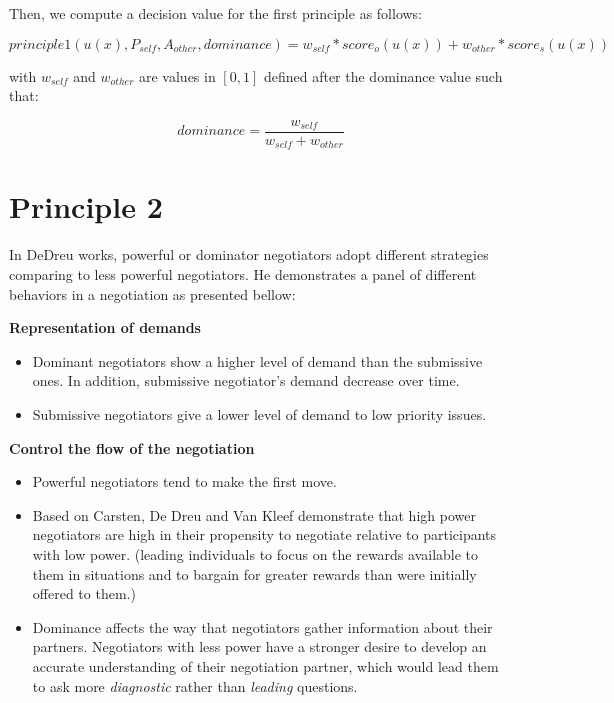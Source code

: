 \documentclass{article}
\begin{document}
	Then, we compute a decision value for the first principle as follows:
	
	$$principle1(u(x),P_{self},A_{other},dominance) = w_{self} * score_o(u(x)) + w_{other} * score_s(u(x))$$
	
	with $w_{self}$ and $w_{other}$ are values in $[0,1]$ defined after the dominance value such that:
	
	$$dominance = \frac{w_{self}}{w_{self}+w_{other}}$$
	

	
	

	
	
	\section{Principle 2}
	
	In DeDreu works, powerful or dominator negotiators adopt different strategies comparing to less powerful negotiators. He demonstrates a panel of different behaviors in a negotiation as presented bellow:
	
	
	\textbf{Representation of demands}
	\begin{itemize}
		\item Dominant negotiators show a higher level of demand than the submissive ones. In addition, submissive negotiator's demand decrease over time. 
		\item Submissive negotiators give a lower level of demand to low priority issues.
	\end{itemize} 
	
	
	
	\textbf{Control the flow of the negotiation}
	\begin{itemize}
		\item Powerful negotiators tend to make the first move. \cite{magee2007power}
	
		\item Based on Carsten, De Dreu and Van Kleef demonstrate that high power negotiators are high in their propensity to negotiate relative to participants with low power. (leading individuals to focus on the rewards available to them in situations and to bargain for	greater rewards than were initially offered to them.)
	
		\item Dominance affects the way that negotiators gather information about their partners. Negotiators with less power have a stronger desire to develop an accurate understanding of their negotiation partner, which would lead them to ask more \emph{diagnostic} rather than \emph{leading} questions.
		
	\end{itemize} 
	
\end{document}
